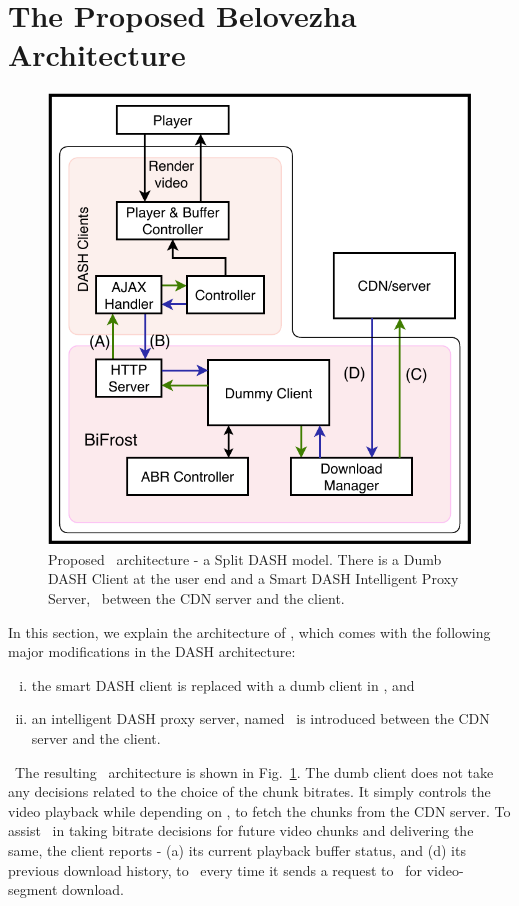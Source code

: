 \section{The Proposed Belovezha Architecture}\label{sec:chap05:proposed_work}
\begin{figure}[h]
    \centering
    \includegraphics[width=\linewidth]{./images/playerDiagram_split.pdf}
    \caption{Proposed \bel\ architecture - a Split DASH model. There is a Dumb DASH Client at the user end and a Smart DASH Intelligent Proxy Server, \servname\, between the CDN server and the client.}
    \label{fig:chap05:splitDASH}
\end{figure}
In this section, we explain the architecture of \bel, which comes with the following major modifications in the DASH architecture:
\begin{enumerate}[(i)]
    \item the smart \ac{DASH} client is replaced with a dumb client in \bel , and
    \item an intelligent DASH proxy server, named \servname\, is introduced between the \ac{CDN} server and the client.
\end{enumerate}\
The resulting \bel\ architecture is shown in Fig.~\ref{fig:chap05:splitDASH}. The dumb client does not take any decisions related to the choice of the chunk bitrates. It simply controls the video playback while depending on \servname, to fetch the chunks from the CDN server. To assist \servname\ in taking bitrate decisions for future video chunks and delivering the same, the client reports - (a) its current playback buffer status,  and (d) its previous download history, to \servname\ every time it sends a request to \servname\ for video-segment download. \\

